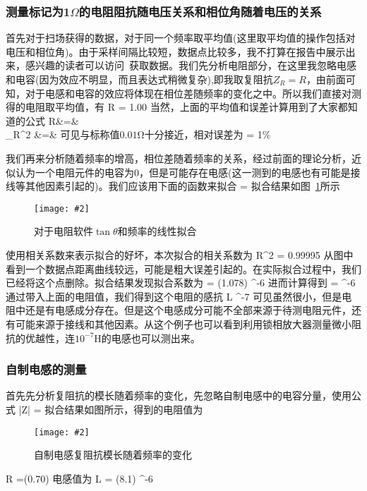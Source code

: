 \documentclass[11pt,a4paper]{ctexart}
\newcommand{\cpic}[2]{
\begin{center}
\texttt{[image: \#2]}
\end{center}
}
\newcommand{\cpicn}[3]
{
\begin{figure}[H]
\cpic{#1}{#2}
\caption{\color{red}#3\label{#2}}
\end{figure}
}
\begin{document}
\subsubsection{测量标记为1$\Omega$的电阻阻抗随电压关系和相位角随着电压的关系}
首先对于扫场获得的数据，对于同一个频率取平均值(这里取平均值的操作包括对电压和相位角)。由于采样间隔比较短，数据点比较多，我不打算在报告中展示出来，感兴趣的读者可以访问~\cite{github}获取数据。我们先分析电阻部分，在这里我忽略电感和电容(因为效应不明显，而且表达式稍微复杂),即我取复阻抗$Z_R = R$，由前面可知，对于电感和电容的效应将体现在相位差随频率的变化之中。所以我们直接对测得的电阻取平均值，有
\beq
 R = 1.00 \mathrm{\Omega}
 \eeq
 当然，上面的平均值和误差计算用到了大家都知道的公式
 \bea
 \langle R\rangle&=&  \\
 \sigma_R^2 &=& 
 \eea
 可见与标称值$0.01\mathrm{\Omega}$十分接近，相对误差为
 \beq
  = 1\%
 \eeq

 我们再来分析随着频率的增高，相位差随着频率的关系，经过前面的理论分析，近似认为一个电阻元件的电容为0，但是可能存在电感(这一测到的电感也有可能是接线等其他因素引起的)。我们应该用下面的函数来拟合
 \beq
 \tan\theta = 
 \eeq
 拟合结果如图~\ref{theta-freq-pure}所示
 \cpicn{0.5}{theta-freq-pure}{对于电阻软件$\tan\theta$和频率的线性拟合}
 使用相关系数来表示拟合的好坏，本次拟合的相关系数为
 \beq
 R^2 = 0.99995
 \eeq
 从图中看到一个数据点距离曲线较远，可能是粗大误差引起的。在实际拟合过程中，我们已经将这个点删除。拟合结果发现拟合系数为
 \beq
  = (1.078)  ^{-6} 
 \eeq
 进而计算得到
 \beq
  =    ^{-6}  
 \eeq
 通过带入上面的电阻值，我们得到这个电阻的感抗
 \beq
 L  ^{-7} 
 \eeq
 可见虽然很小，但是电阻中还是有电感成分存在。但是这个电感成分可能不全部来源于待测电阻元件，还有可能来源于接线和其他因素。从这个例子也可以看到利用锁相放大器测量微小阻抗的优越性，连$10^{-7}\mathrm{H}$的电感也可以测出来。
 
 \subsubsection{自制电感的测量}
 首先先分析复阻抗的模长随着频率的变化，先忽略自制电感中的电容分量，使用公式
 \beq
 |Z| = 
 \eeq
 拟合结果如图所示，得到的电阻值为
 \cpicn{0.5}{freq-resis-inductance.jpg}{自制电感复阻抗模长随着频率的变化}
 \beq
 R =(0.70)\mathrm{\Omega}
 \eeq
 电感值为
 \beq
 L = (8.1) ^{-6}
 \eeq
\end{document}
